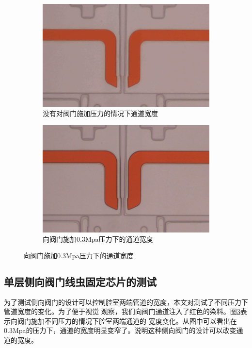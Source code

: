 	\begin{figure}[!htp]
	  \centering
	  \begin{subfigure}{0.45\textwidth}
		\centering
		\includegraphics[width=1\linewidth]{figure/chap1/singlelayertest1.jpg}
		\caption{没有对阀门施加压力的情况下通道宽度}
		\label{fig:before1}   
	  \end{subfigure}
		\hspace{1em}
	  \begin{subfigure}{0.45\textwidth}
		\centering
		\includegraphics[width=1\linewidth]{figure/chap1/singlelayertest2.jpg}
		\caption{向阀门施加0.3Mpa压力下的通道宽度}
		\label{fig:after1}
	  \end{subfigure}
	  \label{fig:chap1:width}
	\end{figure}
\subsection{单层侧向阀门线虫固定芯片的测试}
	为了测试侧向阀门的设计可以控制腔室两端管道的宽度，本文对测试了不同压力下管道宽度的变化。为了便于视觉
	观察，我们向阀门通道注入了红色的染料。图\ref{fig:chap1:width}表示向阀门施加不同压力的情况下腔室两端通道的
	宽度变化。从图中可以看出在0.3Mpa的压力下，通道的宽度明显变窄了。说明这种侧向阀门的设计可以改变通道的宽度。
	
